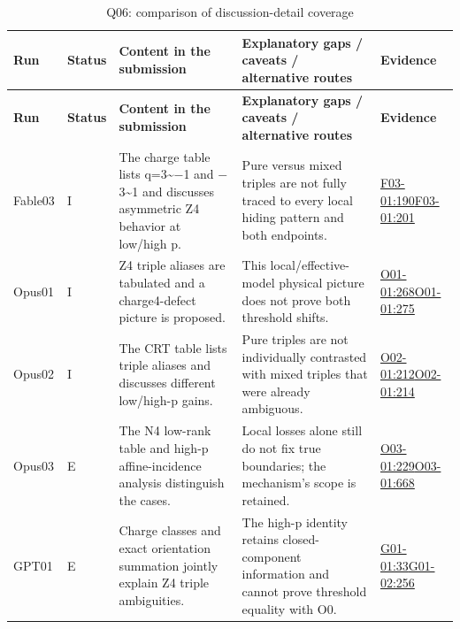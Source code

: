 \documentclass[11pt,a4paper]{article}
\begin{document}
{\fontsize{9.0}{12.6}\selectfont
\setlength{\tabcolsep}{2.5pt}
\begin{longtable}{>{\raggedright\arraybackslash}p{}>{\raggedright\arraybackslash}p{}>{\raggedright\arraybackslash}p{}>{\raggedright\arraybackslash}p{}>{\raggedright\arraybackslash}p{}}
\caption{Q06: comparison of discussion-detail coverage}\\
\toprule
\textbf{Run} & \textbf{Status} & \textbf{Content in the submission} & \textbf{Explanatory gaps /\allowbreak{} caveats /\allowbreak{} alternative routes} & \textbf{Evidence}\tabularnewline
\midrule
\endfirsthead
\toprule
\textbf{Run} & \textbf{Status} & \textbf{Content in the submission} & \textbf{Explanatory gaps /\allowbreak{} caveats /\allowbreak{} alternative routes} & \textbf{Evidence}\tabularnewline
\midrule
\endhead
{}Fable03 & I & The charge table lists q=3\textasciitilde{}\ensuremath{-}1 and \ensuremath{-}3\textasciitilde{}1 and discusses asymmetric Z4 behavior at low/\allowbreak{}high p. & Pure versus mixed triples are not fully traced to every local hiding pattern and both endpoints. & \hyperref[src:F03-01]{F03-01:190}\newline \hyperref[src:F03-01]{F03-01:201}\tabularnewline
{}Opus01 & I & Z4 triple aliases are tabulated and a charge4-defect picture is proposed. & This local/\allowbreak{}effective-model physical picture does not prove both threshold shifts. & \hyperref[src:O01-01]{O01-01:268}\newline \hyperref[src:O01-01]{O01-01:275}\tabularnewline
{}Opus02 & I & The CRT table lists triple aliases and discusses different low/\allowbreak{}high-p gains. & Pure triples are not individually contrasted with mixed triples that were already ambiguous. & \hyperref[src:O02-01]{O02-01:212}\newline \hyperref[src:O02-01]{O02-01:214}\tabularnewline
{}Opus03 & E & The N4 low-rank table and high-p affine-incidence analysis distinguish the cases. & Local losses alone still do not fix true boundaries; the mechanism’s scope is retained. & \hyperref[src:O03-01]{O03-01:229}\newline \hyperref[src:O03-01]{O03-01:668}\tabularnewline
{}GPT01 & E & Charge classes and exact orientation summation jointly explain Z4 triple ambiguities. & The high-p identity retains closed-component information and cannot prove threshold equality with O0. & \hyperref[src:G01-01]{G01-01:33}\newline \hyperref[src:G01-02]{G01-02:256}\tabularnewline

\end{longtable}}
\end{document}
